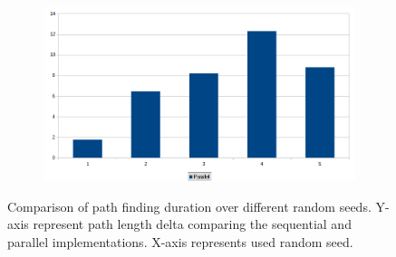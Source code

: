 \documentclass{article}
\begin{document}
\begin{figure}[h]
    \centering
    \begin{subfigure}[b]{1.0\textwidth}
        \centering
        \includegraphics[width=\textwidth]{figures/map_length_diff.png}
    \end{subfigure}
    \hfill
    \caption{Comparison of path finding duration over different random seeds. Y-axis represent path length delta comparing the sequential and parallel implementations. X-axis represents used random seed.}
    \label{fig:map_variance_path}
\end{figure}
%
\end{document}
